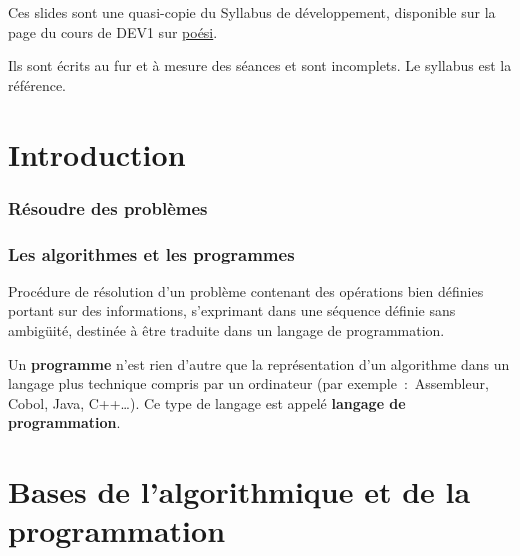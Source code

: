 \begin{frame}[plain]
  \titlepage
\end{frame}


\begin{hideedit}
\begin{frame}
  Ces slides sont une quasi-copie du Syllabus de développement, disponible sur
  la page du cours de DEV1 sur \href{https://poesi.esi-bru.be}{poési}.

  Ils sont écrits au fur et à mesure des séances et sont incomplets. Le
  syllabus est la référence.

\end{frame}

\part{Introduction}
\frame{\partpage}
\section{Résoudre des problèmes}
\frame{\sectionpage}
\section{Les algorithmes et les programmes}
\frame{\sectionpage}
\begin{frame}
  \begin{definition}[Algorithme]
    Procédure de résolution d’un problème 
    contenant des opérations bien définies 
    portant sur des informations, 
    s’exprimant dans une séquence définie sans ambigüité, 
    destinée à être traduite dans un langage de programmation.
  \end{definition}
  \begin{definition}[Programme]
    Un \textbf{programme} n’est rien d’autre 
    que la représentation d’un algorithme 
    dans un langage plus technique compris par un ordinateur 
    (par exemple~:~Assembleur, Cobol, Java, C++\dots). 
    Ce type de langage est appelé 
    \textbf{langage de programmation}.
  \end{definition}
\end{frame}

\part{Bases de l'algorithmique et de la programmation}
\frame{\partpage}


\end{hideedit}
